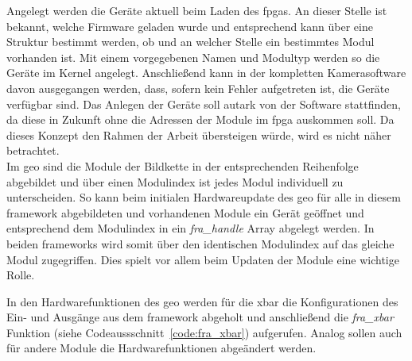 Angelegt werden die Geräte aktuell beim Laden des \ac{fpga}s. An dieser Stelle ist bekannt, welche Firmware geladen wurde und entsprechend kann über eine Struktur bestimmt werden, ob und an welcher Stelle ein bestimmtes Modul vorhanden ist. Mit einem vorgegebenen Namen und Modultyp werden so die Geräte im Kernel angelegt. Anschließend kann in der kompletten Kamerasoftware davon ausgegangen werden, dass, sofern kein Fehler aufgetreten ist, die Geräte verfügbar sind. Das Anlegen der Geräte soll autark von der Software stattfinden, da diese in Zukunft ohne die Adressen der Module im \ac{fpga} auskommen soll. Da dieses Konzept den Rahmen der Arbeit übersteigen würde, wird es nicht näher betrachtet. \\

Im \ac{geo} sind die Module der Bildkette in der entsprechenden Reihenfolge abgebildet und über einen Modulindex ist jedes Modul individuell zu unterscheiden. So kann beim initialen Hardwareupdate des \ac{geo} für alle in diesem \gls{framework} abgebildeten und vorhandenen Module ein Gerät geöffnet und entsprechend dem Modulindex in ein \textit{fra\_handle} Array abgelegt werden. In beiden \glspl{framework} wird somit über den identischen Modulindex auf das gleiche Modul zugegriffen. Dies spielt vor allem beim Updaten der Module eine wichtige Rolle.


In den Hardwarefunktionen des \ac{geo} werden für die \ac{xbar} die Konfigurationen des Ein- und Ausgänge aus dem \gls{framework} abgeholt und anschließend die \textit{fra\_xbar} Funktion (siehe Codeaussschnitt~\ref{code:fra_xbar}) aufgerufen. Analog sollen auch für andere Module die Hardwarefunktionen abgeändert werden.








